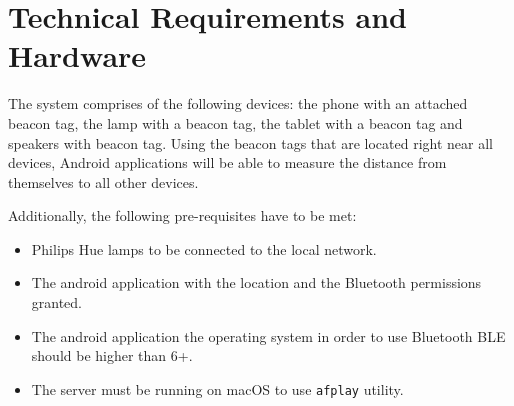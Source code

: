 \section{Technical Requirements and Hardware}
\label{sec:technical-requirements-and-hardware}
The system comprises of the following devices: the phone with an attached beacon tag,
the lamp with a beacon tag, the tablet with a beacon tag and speakers with beacon tag.
Using the beacon tags that are located right near all devices, Android applications
will be able to measure the distance from themselves to all other devices.

Additionally, the following pre-requisites have to be met:
\begin{itemize}
    \item Philips Hue lamps to be connected to the local network.
    \item The android application with the location and the Bluetooth permissions granted.
    \item The android application the operating system in order to use Bluetooth BLE should be higher than 6+.
    \item The server must be running on macOS to use \texttt{afplay} utility.
\end{itemize}



